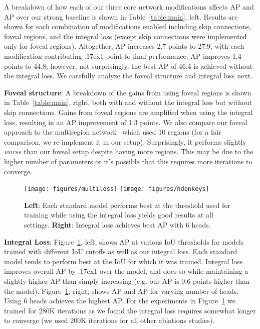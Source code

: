 \documentclass{bmvc2k}
\newcommand{\app}{\raise.17ex\hbox{}}
\newcommand{\Caption}[1]{\caption{\small#1}}
\newcommand{\AP}[1]{AP\xspace}
\newcommand{\fig}[1]{Figure~\ref{fig:#1}}
\newcommand{\tab}[1]{Table~\ref{table:#1}}
\begin{document}
A breakdown of how each of our three core network modifications affects AP and \AP{50} over our strong baseline is shown in \tab{main}, left. Results are shown for each combination of modifications enabled including skip connections, foveal regions, and the integral loss (except skip connections were implemented only for foveal regions). Altogether, AP increases 2.7 points to 27.9, with each modification contributing \app1 point to final performance. \AP{50} improves 1.4 points to 44.8; however, not surprisingly, the best \AP{50} of 46.4 is achieved without the integral loss. We carefully analyze the foveal structure and integral loss next.

\textbf{Foveal structure}: A breakdown of the gains from using foveal regions is shown in \tab{main}, right, both with and without the integral loss but without skip connections. Gains from foveal regions are amplified when using the integral loss, resulting in an AP improvement of 1.3 points. We also compare our foveal approach to the multiregion network~\cite{gidaris2015object} which used 10 regions (for a fair comparison, we re-implement it in our setup). Surprisingly, it performs slightly \emph{worse} than our foveal setup despite having more regions. This may be due to the higher number of parameters or it's possible that this requires more iterations to converge.

\begin{figure}[t]\centering
 \texttt{[image: figures/multiloss]}
 \texttt{[image: figures/ndonkeys]}
\Caption{\textbf{Left}: Each standard model performs best at the threshold used for training while using the integral loss yields good results at all settings. \textbf{Right}: Integral loss achieves best AP with 6 heads.}
\label{fig:integral}
\end{figure}


\textbf{Integral Loss}: \fig{integral}, left, shows AP at various IoU thresholds for models trained with different IoU cutoffs  as well as our integral loss. Each standard model tends to perform best at the IoU for which it was trained. Integral loss improves overall AP by \app1 over the  model, and does so while maintaining a slightly higher \AP{50} than simply increasing  (e.g. our \AP{50} is 0.6 points higher than the  model). \fig{integral}, right, shows AP and \AP{50} for varying number of heads. Using 6 heads  achieves the highest AP. For the experiments in \fig{integral} we trained for 280K iterations as we found the integral loss requires somewhat longer to converge (we used 200K iterations for all other ablations studies).
\end{document}
